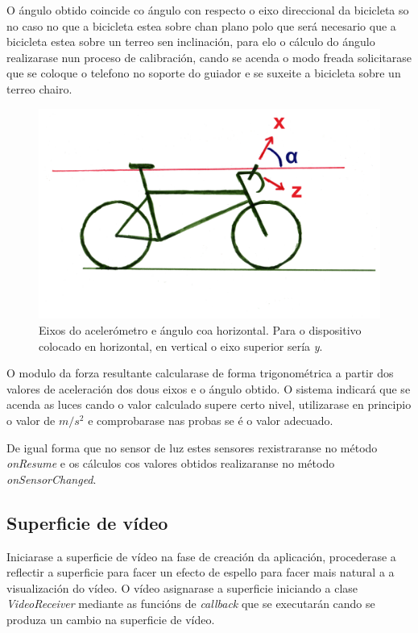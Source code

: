 O ángulo obtido coincide co ángulo con respecto o eixo direccional da bicicleta so no caso no que a bicicleta estea sobre chan plano polo que será necesario que a bicicleta estea sobre un terreo sen inclinación, para elo o cálculo do ángulo realizarase nun proceso de calibración, cando se acenda o modo freada solicitarase que se coloque o telefono no soporte do guiador e se suxeite a bicicleta sobre un terreo chairo.
\begin{figure}[tb]
  \centering
  \includegraphics[scale=.6]{imaxes/angulo.png}
  \caption{Eixos do acelerómetro e ángulo coa horizontal. Para o dispositivo colocado en horizontal, en vertical o eixo superior sería \emph{y}.}
  \label{f:angulo}
\end{figure}

O modulo da forza resultante calcularase de forma trigonométrica a partir dos valores de aceleración dos dous eixos e o ángulo obtido. O sistema indicará que se acenda as luces cando o valor calculado supere certo nivel, utilizarase en principio o valor de $m/s^2$ e comprobarase nas probas se é o valor adecuado.

De igual forma que no sensor de luz estes sensores rexistraranse no método \emph{onResume} e os cálculos cos valores obtidos realizaranse no método \emph{onSensorChanged}.

\subsection{Superficie de vídeo}
Iniciarase a superficie de vídeo na fase de creación da aplicación, procederase a reflectir a superficie para facer un efecto de espello para facer mais natural a a visualización do vídeo. O vídeo asignarase a superficie iniciando a clase \emph{VideoReceiver} mediante as funcións de \emph{callback} que se executarán cando se produza un cambio na superficie de vídeo.


